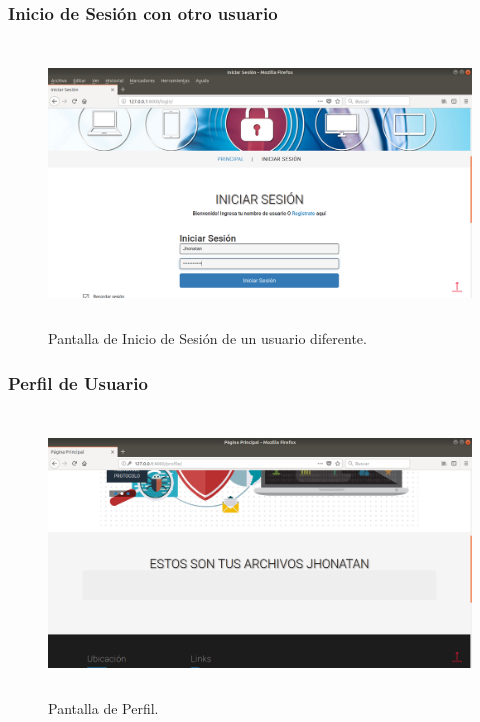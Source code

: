 \subsubsection{Inicio de Sesión con otro usuario}

			\begin{figure}[H]
			\centering
			\includegraphics[width=14cm, height=7.5cm]{./images/Implementacion/InicioSesionOtroUsuario.png}
			\caption{Pantalla de Inicio de Sesión de un usuario diferente.}
			\label{fig:6-1-19} 
			\end{figure}

\subsubsection{Perfil de Usuario}

			\begin{figure}[H]
			\centering
			\includegraphics[width=14cm, height=7.5cm]{./images/Implementacion/PerfilOtroUsuario.png}
			\caption{Pantalla de Perfil.}
			\label{fig:6-1-20} 
			\end{figure}

